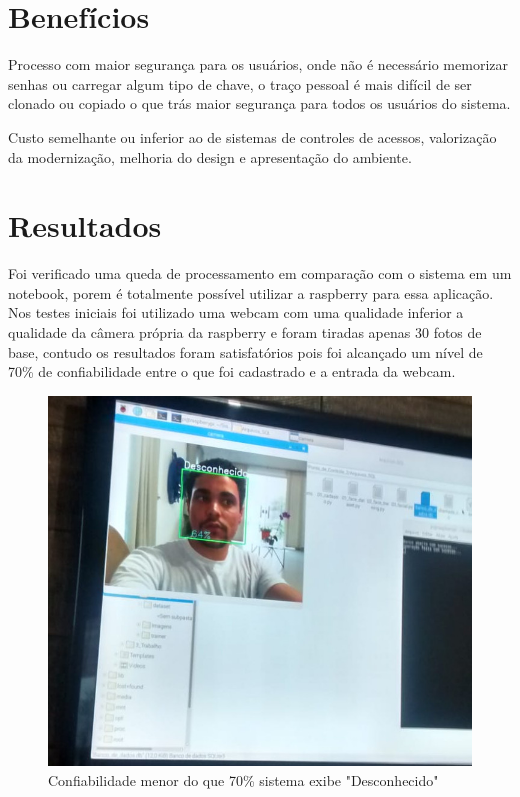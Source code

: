 \documentclass[conference,compsoc]{IEEEtran}
\begin{document}
\section{Benefícios}
Processo com maior segurança para os usuários, onde não é necessário  memorizar senhas ou carregar algum tipo de chave, o traço pessoal é mais difícil de ser clonado ou copiado o que trás maior segurança para todos os usuários do sistema.

Custo semelhante ou inferior ao de sistemas de controles de acessos, valorização da modernização, melhoria do design e apresentação do ambiente.

\section{Resultados}

Foi verificado uma queda de processamento em comparação com o sistema em um notebook, porem é totalmente possível utilizar a raspberry para essa aplicação. Nos testes iniciais foi utilizado uma webcam com uma qualidade inferior a qualidade da câmera própria da raspberry e foram tiradas apenas 30 fotos de base, contudo os resultados foram satisfatórios pois foi alcançado um nível de 70\% de confiabilidade entre o que foi cadastrado e a entrada da webcam.

\begin{figure}[!ht]
		\centering
		\includegraphics[scale=0.20]{teste1_1.jpeg}
		\caption{Confiabilidade menor do que 70\% sistema exibe "Desconhecido"}
\end{figure}
\end{document}
